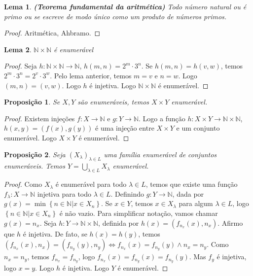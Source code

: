 \documentclass{article}
\theoremstyle{plain}
\newtheorem{prop}{Proposição}[section]
\newtheorem{lema}{Lema}
\theoremstyle{definition}
\theoremstyle{remark}
\begin{document}
\begin{lema}
	\textbf{(Teorema fundamental da aritmética)} Todo número natural ou é primo ou se escreve de modo único como um produto de números primos.
\end{lema}
\begin{proof}
	Aritmética, Ahbramo. %
\end{proof}
\begin{lema}
	$\mathbb{N} \times \mathbb{N}$ é enumerável
\end{lema}
\begin{proof}
	Seja $h:\mathbb{N} \times \mathbb{N} \to \mathbb{N}$, $ h(m,n) = 2^m\cdot 3^n$. Se $h(m,n) = h(v,w)$, temos $2^m\cdot 3^n = 2^v\cdot 3^w$. Pelo lema anterior, temos $m = v$ e $n = w$. Logo $(m,n) = (v,w)$. Logo $h$ é injetiva. Logo $\mathbb{N}\times \mathbb{N}$ é enumerável.
\end{proof}
\begin{prop}
	Se $X,Y$ são enumeráveis, temos $X\times Y$ enumerável.
\end{prop}
\begin{proof}
	Existem injeções $f: X \to \mathbb{N}$ e $g: Y \to \mathbb{N}$. Logo a função $h : X \times Y \to \mathbb{N} \times \mathbb{N}$, $h(x,y) = (f(x), g(y))$ é uma injeção entre $X \times Y$ e um conjunto enumerável.  Logo $X\times Y$ é enumerável.
\end{proof}
\begin{prop}
	Seja $(X_{\lambda})_{\lambda \in L}$ uma família enumerável de conjuntos enumeráveis. Temos $Y = \displaystyle\bigcup_{\lambda \in L} X_{\lambda}$ enumerável.
\end{prop}
\begin{proof}
	Como $X_{\lambda}$ é enumerável para todo $\lambda\in L$, temos que existe uma função $f_\lambda : X \to \mathbb{N}$ injetiva para todo $\lambda\in L$. Definindo $g: Y \to \mathbb{N}$, dada por $g(x) = \min \left\{ n\in \mathbb{N} | x \in X_n \right\}$. Se $x\in Y$, temos $x\in X_\lambda$ para algum $\lambda \in L$, logo $\left\{n \in \mathbb{N} |  x\in X_{n}\right\}$ é não vazio. Para simplificar notação, vamos chamar $g(x) = n_x$.  Seja $h: Y \to \mathbb{N} \times \mathbb{N}$, definida por $h(x) = \left( f_{n_x}(x), n_x\right)$.  Afirmo que $h$ é injetiva. De fato, se $h(x) = h(y)$, temos $(f_{n_x}(x), n_x) = (f_{n_y}(y), n_y) \iff f_{n_x}(x) = f_{n_y}(y) \land n_x = n_y$. Como $n_x = n_y$, temos  $f_{n_x} = f_{n_y}$, logo $f_{n_x}(x) = f_{n_y}(x) = f_{n_y}(y)$. Mas $f_y$ é injetiva, logo $x = y$. Logo $h$ é injetiva. Logo $Y$ é enumerável.
\end{proof}
\end{document}
